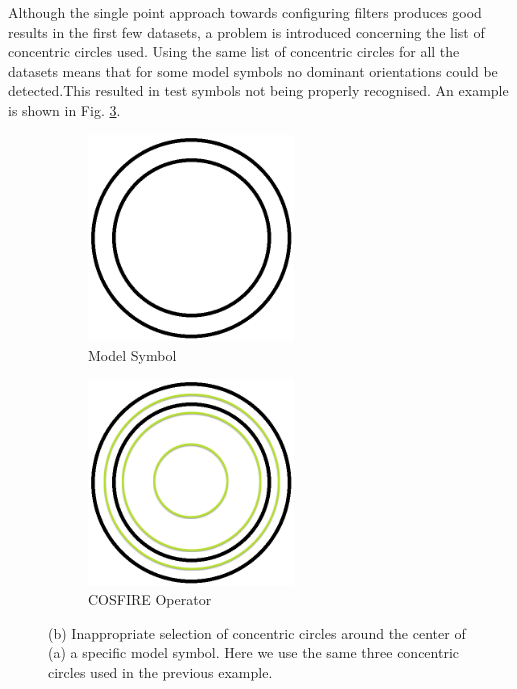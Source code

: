 Although the single point approach towards configuring filters produces good results in the first few datasets, a problem is introduced concerning the list of concentric circles used. Using the same list of concentric circles for all the datasets means that for some model symbols no dominant orientations could be detected.This resulted in test symbols not being properly recognised. An example is shown in Fig. \ref{fig:COSFIREoperatorErrorExample}.\\

\begin{figure}[h]
        \centering
        \begin{subfigure}[b]{0.3\textwidth}
                \centering
                \includegraphics[width=0.6\textwidth]{figures/Method/ModelSymbol2.png}
                \caption{Model Symbol}
                \label{fig:modelsymbol}
        \end{subfigure}
        \begin{subfigure}[b]{0.3\textwidth}
                \centering
                \includegraphics[width=0.6\textwidth]{figures/Method/CosfireOperatorSinglePointApproachError.png}
                \caption{COSFIRE Operator}
                \label{fig:cosfireoperator}
        \end{subfigure}
        \caption[Example of an incorrect configuration due to rho list ]{(b) Inappropriate selection of concentric circles around the center of (a) a specific model symbol. Here we use the same three concentric circles used in the previous example.}
        \label{fig:COSFIREoperatorErrorExample}
\end{figure}
